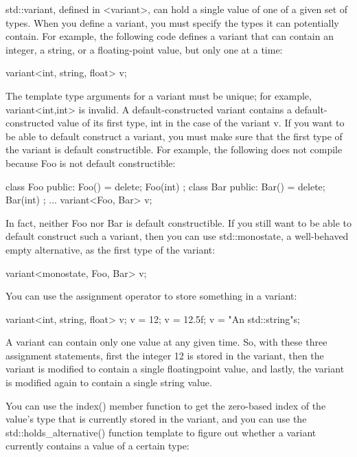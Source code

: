 std::variant, defined in <variant>, can hold a single value of one of a given set of types. When you define a variant, you must specify the types it can potentially contain. For example, the following code defines a variant that can contain an integer, a string, or a floating-point value, but only one at a time:

\begin{cpp}
variant<int, string, float> v;
\end{cpp}

The template type arguments for a variant must be unique; for example, variant<int,int> is invalid. A default-constructed variant contains a default-constructed value of its first type, int in the case of the variant v. If you want to be able to default construct a variant, you must make sure that the first type of the variant is default constructible. For example, the following does not compile because Foo is not default constructible:

\begin{cpp}
class Foo { public: Foo() = delete; Foo(int) {} };
class Bar { public: Bar() = delete; Bar(int) {} };
...
variant<Foo, Bar> v;
\end{cpp}

In fact, neither Foo nor Bar is default constructible. If you still want to be able to default construct such a variant, then you can use std::monostate, a well-behaved empty alternative, as the first type of the variant:

\begin{cpp}
variant<monostate, Foo, Bar> v;
\end{cpp}

You can use the assignment operator to store something in a variant:

\begin{cpp}
variant<int, string, float> v;
v = 12;
v = 12.5f;
v = "An std::string"s;
\end{cpp}

A variant can contain only one value at any given time. So, with these three assignment statements, first the integer 12 is stored in the variant, then the variant is modified to contain a single floatingpoint value, and lastly, the variant is modified again to contain a single string value.

You can use the index() member function to get the zero-based index of the value’s type that is currently stored in the variant, and you can use the std::holds\_alternative() function template to figure out whether a variant currently contains a value of a certain type:

